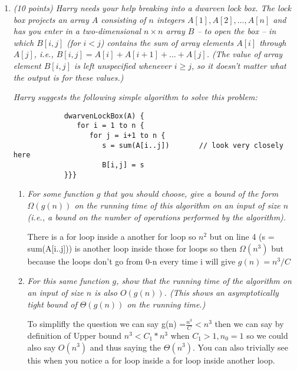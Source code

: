 \documentclass[12pt]{article}
\begin{document}
\begin{enumerate}
    \newpage

	\item\textit{ (10 points) Harry needs your help breaking into a dwarven lock box. The lock box projects an array $A$ consisting of $n$ integers $A[1], A[2], \dots , A[n]$ and has you enter in a two-dimensional $n\times n$ array $B$ -- to open the box -- in which $B[i,j]$ (for $i<j$) contains the sum of array elements $A[i]$ through $A[j]$, i.e., $B[i,j] = A[i]+A[i+1]+\dots+A[j]$. (The value of array element $B[i,j]$ is left unspecified whenever $i\geq j$, so it doesn't matter what the output is for these values.)}

	\textit{Harry suggests the following simple algorithm to solve this problem:}
	\begin{small}
    	\begin{verbatim}
        	dwarvenLockBox(A) {
        	   for i = 1 to n {
        	      for j = i+1 to n {
        	         s = sum(A[i..j])       // look very closely here
        	         B[i,j] = s
        	}}}
    	\end{verbatim}
	\end{small}

	\begin{enumerate}
    	\item\textit{ For some function $g$ that you should choose, give a bound of the form $\Omega(g(n))$ on the running time of this algorithm on an input of size $n$ (i.e., a bound on the number of operations performed by the algorithm).}

There is a for loop inside a another for loop so $n^2$ but on line 4 (s = sum(A[i..j])) is another loop inside those for loops so then $\Omega(n^3)$ but because the loops don't go from 0-n every time i will give $g(n) = n^3 / C$ 
    	\item \textit{For this same function $g$, show that the running time of the algorithm on an input of size $n$ is also $O(g(n))$. (This shows an asymptotically tight bound of $\Theta(g(n))$ on the running time.)}

To simplifly the question we can say g(n) =$ \frac{n^3}{C} < n^3$ then we can say by definition of Upper bound $n^3 < C_1*n^3$ when $C_1 > 1, n_0 = 1$ so we could also say $O(n^3)$ and thus saying the $\Theta(n^3).$ You can also trivially see this when you notice a for loop inside a for loop inside another loop.  
	\end{enumerate}

    \newpage


\end{enumerate}
\end{document}
